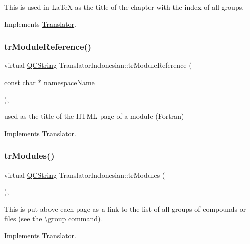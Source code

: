 This is used in La\+TeX as the title of the chapter with the index of all groups. 

Implements \mbox{\hyperlink{class_translator}{Translator}}.

\mbox{\label{class_translator_indonesian_a2304584bef45d3c6c6144a7460e89c18}} 
\subsubsection{\texorpdfstring{trModuleReference()}{trModuleReference()}}
{\footnotesize\ttfamily virtual \mbox{\hyperlink{class_q_c_string}{Q\+C\+String}} Translator\+Indonesian\+::tr\+Module\+Reference (\begin{DoxyParamCaption}\item[{const char $\ast$}]{namespace\+Name }\end{DoxyParamCaption})\hspace{0.3cm}{\ttfamily [inline]}, {\ttfamily [virtual]}}

used as the title of the H\+T\+ML page of a module (Fortran) 

Implements \mbox{\hyperlink{class_translator}{Translator}}.

\mbox{\label{class_translator_indonesian_ae6dcd7ca2bcb287ffc1574b275bd7615}} 
\subsubsection{\texorpdfstring{trModules()}{trModules()}}
{\footnotesize\ttfamily virtual \mbox{\hyperlink{class_q_c_string}{Q\+C\+String}} Translator\+Indonesian\+::tr\+Modules (\begin{DoxyParamCaption}{ }\end{DoxyParamCaption})\hspace{0.3cm}{\ttfamily [inline]}, {\ttfamily [virtual]}}

This is put above each page as a link to the list of all groups of compounds or files (see the \textbackslash{}group command). 

Implements \mbox{\hyperlink{class_translator}{Translator}}.

